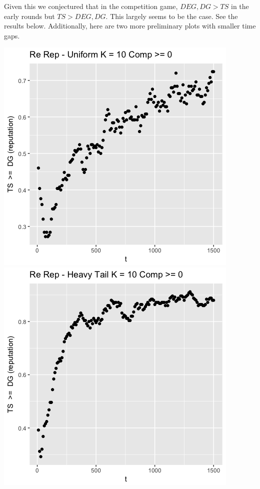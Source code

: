 \documentclass[11pt,letterpaper]{article}
\begin{document}
Given this we conjectured that in the competition game, $DEG, DG > TS$ in the early rounds but $TS > DEG, DG$. This largely seems to be the case. See the results below. Additionally, here are two more preliminary plots with smaller time gaps.

\includegraphics[scale=0.5]{ts_dg_unif_fine} \\
\includegraphics[scale=0.5]{ts_dg_heavy_fine} \\
\end{document}
